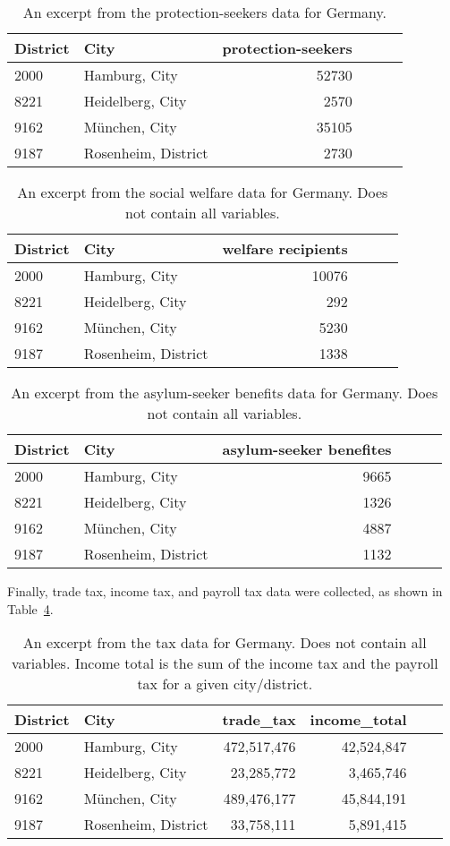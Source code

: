 \begin{table}[H] 
\caption{An excerpt from the protection-seekers data for Germany.\label{protectionGermany}}
\begin{tabular}{l l r r r r}
\toprule
\textbf{District}	& \textbf{City}	& \textbf{protection-seekers}\\
\midrule
2000 & Hamburg, City & 52730\\
8221 & Heidelberg, City & 2570\\
9162 & München, City &  35105\\
9187 & Rosenheim, District & 2730\\
\bottomrule
\end{tabular}
\end{table}
\begin{table}[H] 
\caption{An excerpt from the social welfare data for Germany. Does not contain all variables.\label{welfareGermany}}
\begin{tabular}{l l r r r r}
\toprule
\textbf{District}	& \textbf{City}	& \textbf{welfare recipients}\\
\midrule
2000 & Hamburg, City & 10076\\
8221 & Heidelberg, City & 292\\
9162 & München, City &  5230\\
9187 & Rosenheim, District & 1338\\
\bottomrule
\end{tabular}
\end{table}
\begin{table}[H] 
\caption{An excerpt from the asylum-seeker benefits data for Germany. Does not contain all variables.\label{asylumGermany}}
\begin{tabular}{l l r r r r}
\toprule
\textbf{District}	& \textbf{City}	& \textbf{asylum-seeker benefites}\\
\midrule
2000 & Hamburg, City & 9665\\
8221 & Heidelberg, City & 1326\\
9162 & München, City &  4887\\
9187 & Rosenheim, District & 1132\\
\bottomrule
\end{tabular}
\end{table}
Finally, trade tax, income tax, and payroll tax data were collected, as shown in Table~\ref{taxGermany}.
\begin{table}[H] 
\caption{An excerpt from the tax data for Germany. Does not contain all variables. Income total is the sum of the income tax and the payroll tax for a given city/district.\label{taxGermany}}
\begin{tabular}{l l r r r r}
\toprule
\textbf{District}	& \textbf{City}	& \textbf{trade\_tax}& \textbf{income\_total}\\
\midrule
2000 & Hamburg, City & 472,517,476 & 42,524,847\\
8221 & Heidelberg, City & 23,285,772 & 3,465,746\\
9162 & München, City &  489,476,177 & 45,844,191 \\
9187 & Rosenheim, District & 33,758,111 & 5,891,415 \\
\bottomrule
\end{tabular}
\end{table}
\clearpage
